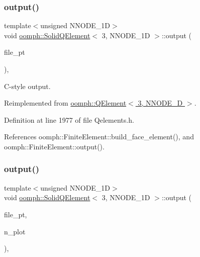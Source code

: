 \subsubsection{\texorpdfstring{output()}{output()}\hspace{0.1cm}{\footnotesize\ttfamily [3/4]}}
{\footnotesize\ttfamily template$<$unsigned N\+N\+O\+D\+E\+\_\+1D$>$ \\
void \hyperlink{classoomph_1_1SolidQElement}{oomph\+::\+Solid\+Q\+Element}$<$ 3, N\+N\+O\+D\+E\+\_\+1D $>$\+::output (\begin{DoxyParamCaption}\item[{F\+I\+LE $\ast$}]{file\+\_\+pt }\end{DoxyParamCaption})\hspace{0.3cm}{\ttfamily [inline]}, {\ttfamily [virtual]}}



C-\/style output. 



Reimplemented from \hyperlink{classoomph_1_1QElement_3_013_00_01NNODE__1D_01_4_a8fa9ec0d0b74e734fc7d4066145c392b}{oomph\+::\+Q\+Element$<$ 3, N\+N\+O\+D\+E\+\_\+D $>$}.



Definition at line 1977 of file Qelements.\+h.



References oomph\+::\+Finite\+Element\+::build\+\_\+face\+\_\+element(), and oomph\+::\+Finite\+Element\+::output().

\mbox{\label{classoomph_1_1SolidQElement_3_013_00_01NNODE__1D_01_4_a0de774d3e5a65e11b485d25f57e7f3a1}} 
\subsubsection{\texorpdfstring{output()}{output()}\hspace{0.1cm}{\footnotesize\ttfamily [4/4]}}
{\footnotesize\ttfamily template$<$unsigned N\+N\+O\+D\+E\+\_\+1D$>$ \\
void \hyperlink{classoomph_1_1SolidQElement}{oomph\+::\+Solid\+Q\+Element}$<$ 3, N\+N\+O\+D\+E\+\_\+1D $>$\+::output (\begin{DoxyParamCaption}\item[{F\+I\+LE $\ast$}]{file\+\_\+pt,  }\item[{const unsigned \&}]{n\+\_\+plot }\end{DoxyParamCaption})\hspace{0.3cm}{\ttfamily [inline]}, {\ttfamily [virtual]}}



